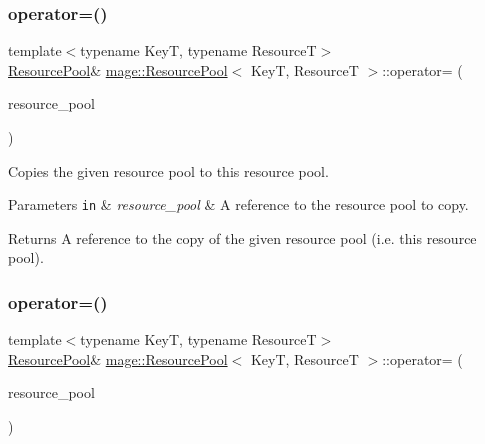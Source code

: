 \subsubsection{\texorpdfstring{operator=()}{operator=()}\hspace{0.1cm}{\footnotesize\ttfamily [1/2]}}
{\footnotesize\ttfamily template$<$typename KeyT, typename ResourceT$>$ \\
\hyperlink{classmage_1_1_resource_pool}{Resource\+Pool}\& \hyperlink{classmage_1_1_resource_pool}{mage\+::\+Resource\+Pool}$<$ KeyT, ResourceT $>$\+::operator= (\begin{DoxyParamCaption}\item[{const \hyperlink{classmage_1_1_resource_pool}{Resource\+Pool}$<$ KeyT, ResourceT $>$ \&}]{resource\+\_\+pool }\end{DoxyParamCaption})\hspace{0.3cm}{\ttfamily [delete]}}

Copies the given resource pool to this resource pool.


\begin{DoxyParams}[1]{Parameters}
\mbox{\tt in}  & {\em resource\+\_\+pool} & A reference to the resource pool to copy. \\
\hline
\end{DoxyParams}
\begin{DoxyReturn}{Returns}
A reference to the copy of the given resource pool (i.\+e. this resource pool). 
\end{DoxyReturn}
\hypertarget{classmage_1_1_resource_pool_a1c0c196460508108435c227c11a65b94}{}\label{classmage_1_1_resource_pool_a1c0c196460508108435c227c11a65b94} 
\subsubsection{\texorpdfstring{operator=()}{operator=()}\hspace{0.1cm}{\footnotesize\ttfamily [2/2]}}
{\footnotesize\ttfamily template$<$typename KeyT, typename ResourceT$>$ \\
\hyperlink{classmage_1_1_resource_pool}{Resource\+Pool}\& \hyperlink{classmage_1_1_resource_pool}{mage\+::\+Resource\+Pool}$<$ KeyT, ResourceT $>$\+::operator= (\begin{DoxyParamCaption}\item[{\hyperlink{classmage_1_1_resource_pool}{Resource\+Pool}$<$ KeyT, ResourceT $>$ \&\&}]{resource\+\_\+pool }\end{DoxyParamCaption})\hspace{0.3cm}{\ttfamily [delete]}}


